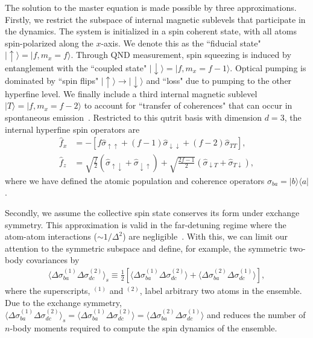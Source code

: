 \documentclass[preprint,aps,pra,onecolumn,superscriptaddress]{revtex4-1} %
\def\bra#1{\langle{#1}\rvert}%
\def\ket#1{\lvert{#1}\rangle}%
\newcommand{\expect}[1]{\big\langle #1 \big\rangle}
\begin{document}
The solution to the master equation is made possible by three approximations. Firstly, we restrict the subspace of internal magnetic sublevels that participate in the dynamics.  The system is initialized in a spin coherent state, with all atoms spin-polarized along the $x$-axis.  We denote this as the ``fiducial state" $\ket{\uparrow} = \ket{f, m_x =f}$.   Through QND measurement, spin squeezing is induced by entanglement with the  ``coupled state"  $\ket{\downarrow} = \ket{f, m_x=f-1}$.  Optical pumping is dominated by ``spin flips" $\ket{\uparrow}\rightarrow \ket{\downarrow}$ and ``loss" due to pumping to the other hyperfine level.  We finally include a third internal magnetic sublevel $\ket{T} = \ket{f, m_x=f-2}$ to account for  ``transfer of coherences" that can occur in spontaneous emission~\cite{Norris2014}.  Restricted to this qutrit basis with dimension $ d=3 $, the internal hyperfine spin operators are
\begin{subequations}\label{eq:fxfz_xbasis}
\begin{align}
\hat{f}_x &= -\left[f \hat{\sigma}_{\uparrow \uparrow} +(f-1) \hat{\sigma}_{\downarrow \downarrow} + (f-2)  \hat{\sigma}_{T T}\right], \\
\hat{f}_z &= \sqrt{\frac{f}{2}} \left(\hat{\sigma}_{\uparrow \downarrow} + \hat{\sigma}_{\downarrow \uparrow}\right) + \sqrt{\frac{2f-1}{2}}  \left(\hat{\sigma}_{\downarrow T} + \hat{\sigma}_{T \downarrow }\right),
\end{align}
\end{subequations}
where we have defined the atomic population and coherence operators $\hat{\sigma}_{ba}=\ket{b}\bra{a}$.

Secondly, we assume the collective spin state conserves its form under exchange symmetry. This approximation is valid in the far-detuning regime where the atom-atom interactions ($ \sim 1/\Delta^2 $) are negligible~\cite{Asenjo-Garcia2017Atom,Asenjo-Garcia2017Exponential}. With this, we can limit our attention to the symmetric subspace and define, for example, the symmetric two-body covariances by
\begin{align}
\expect{\Delta\sigma_{ba}^{(1)}\Delta\sigma_{dc}^{(2)}}_s \equiv \frac{1}{2}\left[\expect{\Delta\sigma_{ba}^{(1)}\Delta\sigma_{dc}^{(2)}}+\expect{\Delta\sigma_{ba}^{(2)}\Delta\sigma_{dc}^{(1)}} \right] ,
\end{align}
where the superscripts, $ ^{(1)} $ and $ ^{(2)} $, label arbitrary two atoms in the ensemble. Due to the exchange symmetry, $ \expect{\Delta\sigma_{ba}^{(1)}\Delta\sigma_{dc}^{(2)}}_s=\expect{\Delta\sigma_{ba}^{(1)}\Delta\sigma_{dc}^{(2)}}=\expect{\Delta\sigma_{ba}^{(2)}\Delta\sigma_{dc}^{(1)}} $ and reduces the number of $ n $-body moments required to compute the spin dynamics of the ensemble.
\end{document}
